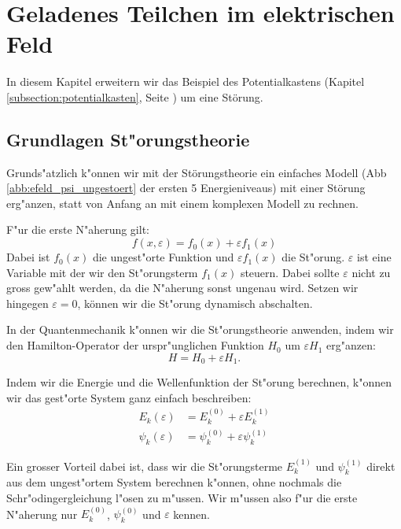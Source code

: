 \chapter{Geladenes Teilchen im elektrischen Feld\label{chapter:efeld}}
\begin{refsection}



In diesem Kapitel erweitern wir das Beispiel des Potentialkastens 
(Kapitel \ref{subsection:potentialkasten}, Seite \pageref{subsection:potentialkasten})
um eine St\"orung.

\section{Grundlagen St"orungstheorie}
Grunds"atzlich k"onnen wir mit der St\"orungstheorie ein einfaches Modell 
(Abb \ref{abb:efeld_psi_ungestoert} der ersten 5 Energieniveaus) 
mit einer St\"orung erg"anzen, statt von Anfang an mit einem komplexen Modell zu rechnen.

F"ur die erste N"aherung gilt:
\[
  f(x, \varepsilon) = f_0(x) + \varepsilon f_1(x)
\]
Dabei ist $f_0(x)$ die ungest"orte Funktion und $\varepsilon f_1(x)$ die St"orung.
$\varepsilon$ ist eine Variable mit der wir den St"orungsterm $f_1(x)$ steuern.
Dabei sollte $\varepsilon$ nicht zu gross gew"ahlt werden,
da die N"aherung sonst ungenau wird.
Setzen wir hingegen $\varepsilon = 0$, k\"onnen wir die St"orung dynamisch abschalten.




In der Quantenmechanik k"onnen wir die St"orungstheorie anwenden,
indem wir den Hamilton-Operator der urspr"unglichen Funktion $H_0$
um $\varepsilon H_1$ erg"anzen:
\[
  H = H_0 + \varepsilon H_1.
\]

Indem wir die Energie und die Wellenfunktion der St"orung berechnen, k"onnen wir das gest"orte System ganz einfach beschreiben:
\begin{equation}
\begin{aligned}
E_k(\varepsilon)&=E_k^{(0)} + \varepsilon E_k^{(1)}
\\
\psi_k(\varepsilon)&=\psi_k^{(0)} + \varepsilon \psi_k^{(1)}
\end{aligned}
\end{equation}

Ein grosser Vorteil dabei ist,
dass wir die St"orungsterme $E_k^{(1)}$ und $\psi_k^{(1)}$
direkt aus dem ungest"ortem System berechnen k"onnen,
ohne nochmals die Schr"odingergleichung l"osen zu m"ussen.
Wir m"ussen also f"ur die erste N"aherung nur $E_k^{(0)}$,
$\psi_k^{(0)}$ und $\varepsilon$ kennen.





\end{refsection}
